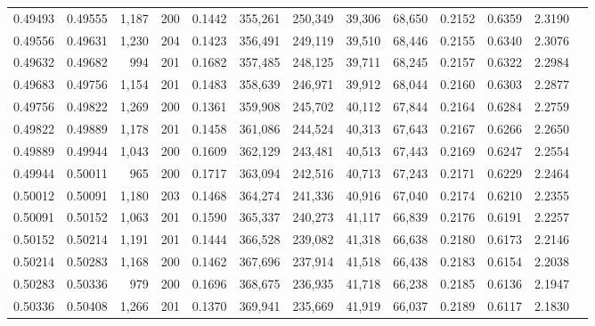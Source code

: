 \begin{tabular}{rrrrrrrrrrrrr}
0.49493 & 0.49555 & 1,187 & 200 &                                     0.1442 & 355,261 & 250,349 &  39,306 &  68,650 & 0.2152 & 0.6359 & 2.3190 \\
0.49556 & 0.49631 & 1,230 & 204 &                                     0.1423 & 356,491 & 249,119 &  39,510 &  68,446 & 0.2155 & 0.6340 & 2.3076 \\
0.49632 & 0.49682 &   994 & 201 &                                     0.1682 & 357,485 & 248,125 &  39,711 &  68,245 & 0.2157 & 0.6322 & 2.2984 \\
0.49683 & 0.49756 & 1,154 & 201 &                                     0.1483 & 358,639 & 246,971 &  39,912 &  68,044 & 0.2160 & 0.6303 & 2.2877 \\
0.49756 & 0.49822 & 1,269 & 200 &                                     0.1361 & 359,908 & 245,702 &  40,112 &  67,844 & 0.2164 & 0.6284 & 2.2759 \\
0.49822 & 0.49889 & 1,178 & 201 &                                     0.1458 & 361,086 & 244,524 &  40,313 &  67,643 & 0.2167 & 0.6266 & 2.2650 \\
0.49889 & 0.49944 & 1,043 & 200 &                                     0.1609 & 362,129 & 243,481 &  40,513 &  67,443 & 0.2169 & 0.6247 & 2.2554 \\
0.49944 & 0.50011 &   965 & 200 &                                     0.1717 & 363,094 & 242,516 &  40,713 &  67,243 & 0.2171 & 0.6229 & 2.2464 \\
0.50012 & 0.50091 & 1,180 & 203 &                                     0.1468 & 364,274 & 241,336 &  40,916 &  67,040 & 0.2174 & 0.6210 & 2.2355 \\
0.50091 & 0.50152 & 1,063 & 201 &                                     0.1590 & 365,337 & 240,273 &  41,117 &  66,839 & 0.2176 & 0.6191 & 2.2257 \\
0.50152 & 0.50214 & 1,191 & 201 &                                     0.1444 & 366,528 & 239,082 &  41,318 &  66,638 & 0.2180 & 0.6173 & 2.2146 \\
0.50214 & 0.50283 & 1,168 & 200 &                                     0.1462 & 367,696 & 237,914 &  41,518 &  66,438 & 0.2183 & 0.6154 & 2.2038 \\
0.50283 & 0.50336 &   979 & 200 &                                     0.1696 & 368,675 & 236,935 &  41,718 &  66,238 & 0.2185 & 0.6136 & 2.1947 \\
0.50336 & 0.50408 & 1,266 & 201 &                                     0.1370 & 369,941 & 235,669 &  41,919 &  66,037 & 0.2189 & 0.6117 & 2.1830 \\

\end{tabular}
